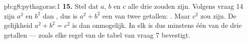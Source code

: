 \begin{solution}{pb:g8:pythagoras:1}
\textbf{15.} Stel dat $a$, $b$ en $c$ alle drie  zouden zijn. Volgens vraag
14 zijn $a^2$ en $b^2$ dan , dus is $a^2 + b^2$ een  van twee 
getallen: \emph{}. Maar $c^2$ zou \emph{} zijn. De gelijkheid
$a^2 + b^2 = c^2$ is dan onmogelijk. In elk  is dus minstens
één van de drie getallen  --- zoals elke regel van de tabel van vraag 7
bevestigt.
\end{solution}

